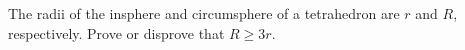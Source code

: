 The radii of the insphere and circumsphere of a tetrahedron are $r$ and $R$, respectively. Prove or disprove that $R \geq 3r$.
